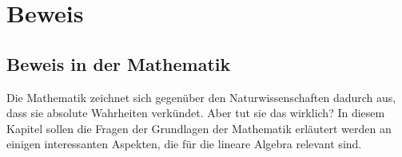 %
%
%
\part{Beweis}

\chapter*{Beweis in der Mathematik}
\rhead{}
Die Mathematik zeichnet sich gegenüber den Naturwissenschaften dadurch
aus, dass sie absolute Wahrheiten verkündet. 
Aber tut sie das wirklich?
In diesem Kapitel sollen die Fragen der Grundlagen der Mathematik
erläutert werden an einigen interessanten Aspekten, die für die lineare
Algebra relevant sind.

